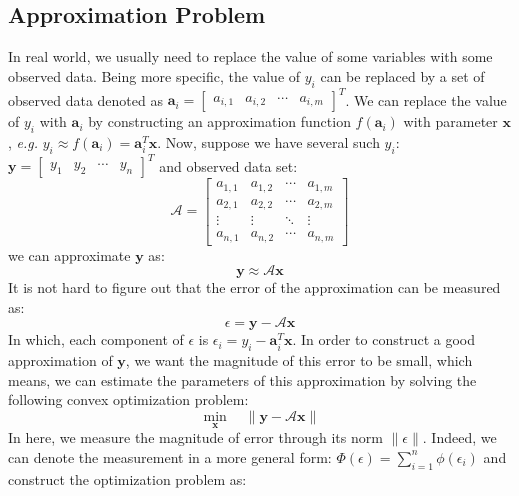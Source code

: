 \documentclass[10pt,a4paper]{article}
\begin{document}
\subsection{Approximation Problem}
In real world, we usually need to replace the value of some variables with some observed data. Being more specific, the value of $y_{i}$ can be replaced by a set of observed data denoted as $\mathbf{a}_{i} = \begin{bmatrix}
a_{i, 1} & a_{i, 2} & \cdots & a_{i, m}
\end{bmatrix}^{T}$. We can replace the value of $y_{i}$ with $\mathbf{a}_{i}$ by constructing an approximation function $f(\mathbf{a}_{i})$ with parameter $\mathbf{x}$, \textsl{e.g.} $y_{i} \approx f(\mathbf{a}_{i}) = \mathbf{a}_{i}^{T} \mathbf{x}$. Now, suppose we have several such $y_{i}$: $\mathbf{y} = \begin{bmatrix}
y_{1} & y_{2} & \cdots & y_{n}
\end{bmatrix}^{T}$ and observed data set:
\begin{equation*}
	\mathcal{A} = \begin{bmatrix}
	a_{1, 1} & a_{1, 2} & \cdots & a_{1, m} \\
	a_{2, 1} & a_{2, 2} & \cdots & a_{2, m} \\
	\vdots & \vdots & \ddots & \vdots \\
	a_{n, 1} & a_{n, 2} & \cdots & a_{n, m}
	\end{bmatrix}
\end{equation*}
we can approximate $\mathbf{y}$ as:
\begin{equation*}
	\mathbf{y} \approx \mathcal{A} \mathbf{x}
\end{equation*}
It is not hard to figure out that the error of the approximation can be measured as:
\begin{equation*}
	\epsilon = \mathbf{y} - \mathcal{A} \mathbf{x}
\end{equation*}
In which, each component of $\epsilon$ is $\epsilon_{i} = y_{i} - \mathbf{a}_{i}^{T} \mathbf{x}$. In order to construct a good approximation of $\mathbf{y}$, we want the magnitude of this error to be small, which means, we can estimate the parameters of this approximation by solving the following convex optimization problem:
\begin{equation*}
	\displaystyle\min_{\mathbf{x}} \quad \| \mathbf{y} - \mathcal{A} \mathbf{x} \|
\end{equation*}
In here, we measure the magnitude of error through its norm $\| \epsilon \|$. Indeed, we can denote the measurement in a more general form: $\Phi(\epsilon) = \displaystyle\sum_{i = 1}^{n} \phi(\epsilon_{i})$ and construct the optimization problem as:
\end{document}
